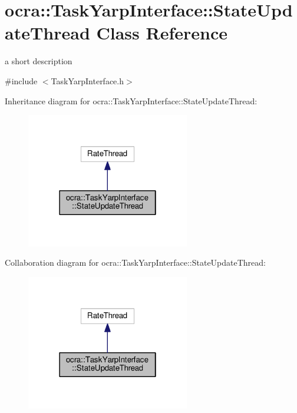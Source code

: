 \hypertarget{classocra_1_1TaskYarpInterface_1_1StateUpdateThread}{}\section{ocra\+:\+:Task\+Yarp\+Interface\+:\+:State\+Update\+Thread Class Reference}
\label{classocra_1_1TaskYarpInterface_1_1StateUpdateThread}


a short description  




{\ttfamily \#include $<$Task\+Yarp\+Interface.\+h$>$}



Inheritance diagram for ocra\+:\+:Task\+Yarp\+Interface\+:\+:State\+Update\+Thread\+:
\nopagebreak
\begin{figure}[H]
\begin{center}
\leavevmode
\includegraphics[width=202pt]{df/d01/classocra_1_1TaskYarpInterface_1_1StateUpdateThread__inherit__graph}
\end{center}
\end{figure}


Collaboration diagram for ocra\+:\+:Task\+Yarp\+Interface\+:\+:State\+Update\+Thread\+:
\nopagebreak
\begin{figure}[H]
\begin{center}
\leavevmode
\includegraphics[width=202pt]{d5/da6/classocra_1_1TaskYarpInterface_1_1StateUpdateThread__coll__graph}
\end{center}
\end{figure}
